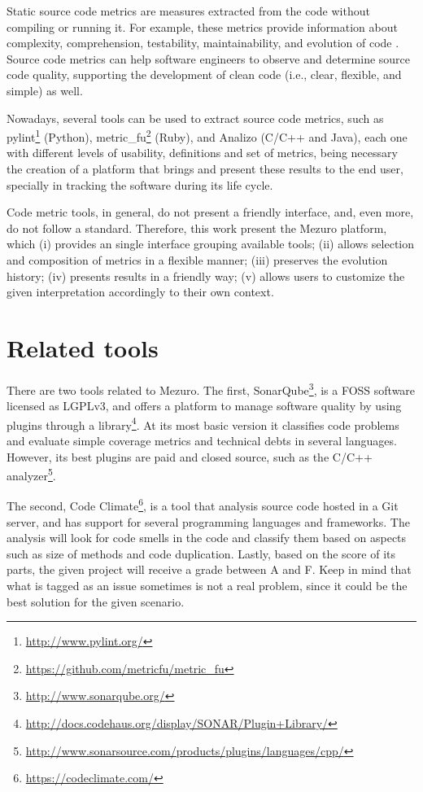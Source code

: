 \documentclass{llncs}
\begin{document}
Static source code metrics are measures extracted from the code without compiling
or running it. For example, these metrics provide information about complexity, comprehension,
testability, maintainability, and evolution of code \cite{mills1988}. Source code metrics can help software engineers to
observe and determine source code quality, supporting the development of clean code (i.e., clear, flexible, and simple) as well\cite{martin2008}.

Nowadays, several tools can be
used to extract source code metrics, such as
pylint\footnote{\url{http://www.pylint.org/}} (Python),
metric\_fu\footnote{\url{https://github.com/metricfu/metric_fu}} (Ruby), and
Analizo (C/C++ and Java)\cite{terceiro2010analizo}, each one with
different levels of usability, definitions and set of metrics, being necessary
the creation of a platform that brings and present these results to the end
user, specially in tracking the software during its life cycle.

Code metric tools, in general, do not present a friendly interface, and,
even more, do not follow a standard. Therefore, this work present the
Mezuro platform, which (i) provides an single interface grouping available tools;
(ii) allows selection and composition of metrics in a flexible manner;
(iii) preserves the evolution history;
(iv) presents results in a friendly way;
(v) allows users to customize the given interpretation accordingly to their own context.

\section{Related tools}

There are two tools related to Mezuro. The first, SonarQube\footnote{\url{http://www.sonarqube.org/}}, is a FOSS software licensed as LGPLv3, and offers a platform to manage software quality by using plugins through a 
library\footnote{\url{http://docs.codehaus.org/display/SONAR/Plugin+Library/}}.
At its most basic version it classifies code problems and evaluate simple
coverage metrics and technical debts in several languages. However, its best
plugins are paid and closed source, such as the
C/C++ analyzer\footnote{\url{http://www.sonarsource.com/products/plugins/languages/cpp/}}.

The second, Code Climate\footnote{\url{https://codeclimate.com/}}, is a tool
that analysis source code hosted in a Git server, and has support for several
programming languages and frameworks. The analysis will look for code smells
in the code and classify them based on aspects such as size of methods and
code duplication. Lastly, based on the score of its parts, the given project
will receive a grade between A and F. Keep in mind that what is tagged as an
issue sometimes is not a real problem, since it could be the best solution for
the given scenario.
\end{document}
